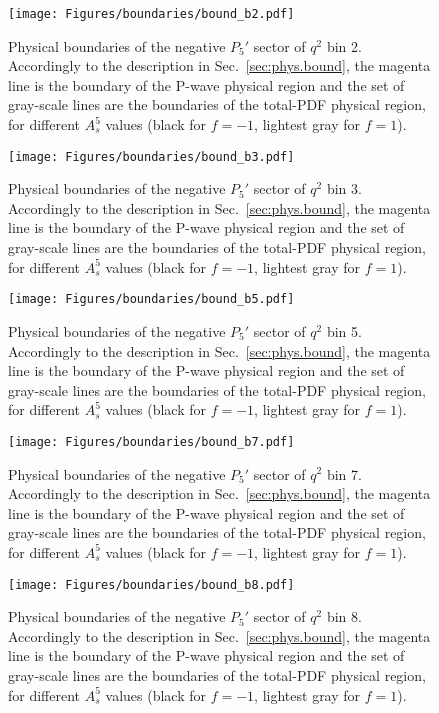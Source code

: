 \begin{figure}[!hbt]
  \centering
  \texttt{[image: Figures/boundaries/bound\_b2.pdf]}
  \caption{Physical boundaries of the negative $P_5'$ sector of $q^2$ bin 2. Accordingly to the description in Sec.~\ref{sec:phys.bound}, the magenta line is the boundary of the P-wave physical region and the set of gray-scale lines are the boundaries of the total-PDF physical region, for different $A_s^5$ values (black for $f=-1$, lightest gray for $f=1$).}
  \label{fig:bound2}
\end{figure}

\begin{figure}[!hbt]
  \centering
  \texttt{[image: Figures/boundaries/bound\_b3.pdf]}
  \caption{Physical boundaries of the negative $P_5'$ sector of $q^2$ bin 3. Accordingly to the description in Sec.~\ref{sec:phys.bound}, the magenta line is the boundary of the P-wave physical region and the set of gray-scale lines are the boundaries of the total-PDF physical region, for different $A_s^5$ values (black for $f=-1$, lightest gray for $f=1$).}
  \label{fig:bound3}
\end{figure}

\begin{figure}[!hbt]
  \centering
  \texttt{[image: Figures/boundaries/bound\_b5.pdf]}
  \caption{Physical boundaries of the negative $P_5'$ sector of $q^2$ bin 5. Accordingly to the description in Sec.~\ref{sec:phys.bound}, the magenta line is the boundary of the P-wave physical region and the set of gray-scale lines are the boundaries of the total-PDF physical region, for different $A_s^5$ values (black for $f=-1$, lightest gray for $f=1$).}
  \label{fig:bound5}
\end{figure}

\begin{figure}[!hbt]
  \centering
  \texttt{[image: Figures/boundaries/bound\_b7.pdf]}
  \caption{Physical boundaries of the negative $P_5'$ sector of $q^2$ bin 7. Accordingly to the description in Sec.~\ref{sec:phys.bound}, the magenta line is the boundary of the P-wave physical region and the set of gray-scale lines are the boundaries of the total-PDF physical region, for different $A_s^5$ values (black for $f=-1$, lightest gray for $f=1$).}
  \label{fig:bound7}
\end{figure}

\begin{figure}[!hbt]
  \centering
  \texttt{[image: Figures/boundaries/bound\_b8.pdf]}
  \caption{Physical boundaries of the negative $P_5'$ sector of $q^2$ bin 8. Accordingly to the description in Sec.~\ref{sec:phys.bound}, the magenta line is the boundary of the P-wave physical region and the set of gray-scale lines are the boundaries of the total-PDF physical region, for different $A_s^5$ values (black for $f=-1$, lightest gray for $f=1$).}
  \label{fig:bound8}
\end{figure}







